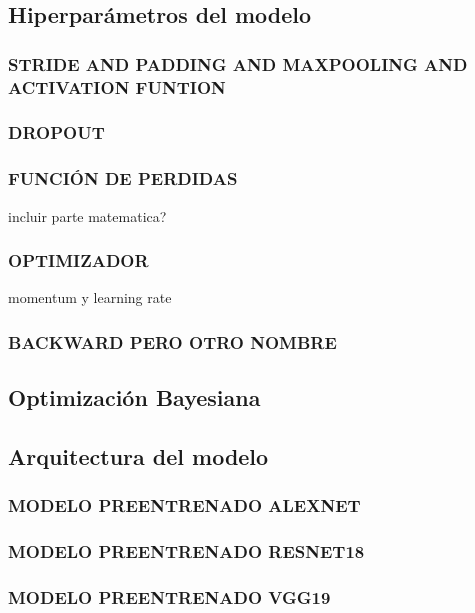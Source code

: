 		
		
			
		
		\subsection{Hiperparámetros del modelo}
			\subsubsection{\MakeUppercase{Stride and Padding and maxpooling and activation funtion}}
			\subsubsection{\MakeUppercase{Dropout}}
			\subsubsection{\MakeUppercase{Función de perdidas}}
			incluir parte matematica?
			\subsubsection{\MakeUppercase{Optimizador}}
			momentum y learning rate
			\subsubsection{\MakeUppercase{Backward pero otro nombre}}
			
			
		\subsection{Optimización Bayesiana}	
			
			
		\subsection{Arquitectura del modelo}
			\subsubsection{\MakeUppercase{Modelo preentrenado ALEXNET}}
			\subsubsection{\MakeUppercase{Modelo preentrenado RESNET18}}
			\subsubsection{\MakeUppercase{Modelo preentrenado VGG19}}
